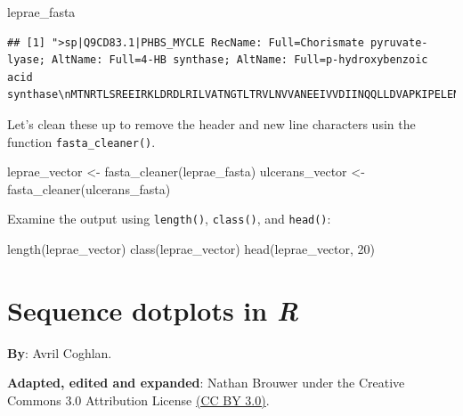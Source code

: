\documentclass[
]{book}
\newenvironment{Shaded}{\begin{snugshade}}{\end{snugshade}}
\newcommand{\DecValTok}[1]{\textcolor[rgb]{0.00,0.00,0.81}{#1}}
\newcommand{\FunctionTok}[1]{\textcolor[rgb]{0.00,0.00,0.00}{#1}}
\newcommand{\NormalTok}[1]{#1}
\newcommand{\OtherTok}[1]{\textcolor[rgb]{0.56,0.35,0.01}{#1}}
\begin{document}
\begin{Shaded}
\begin{Highlighting}[]
\NormalTok{leprae\_fasta}
\end{Highlighting}
\end{Shaded}

\begin{verbatim}
## [1] ">sp|Q9CD83.1|PHBS_MYCLE RecName: Full=Chorismate pyruvate-lyase; AltName: Full=4-HB synthase; AltName: Full=p-hydroxybenzoic acid synthase\nMTNRTLSREEIRKLDRDLRILVATNGTLTRVLNVVANEEIVVDIINQQLLDVAPKIPELENLKIGRILQR\nDILLKGQKSGILFVAAESLIVIDLLPTAITTYLTKTHHPIGEIMAASRIETYKEDAQVWIGDLPCWLADY\nGYWDLPKRAVGRRYRIIAGGQPVIITTEYFLRSVFQDTPREELDRCQYSNDIDTRSGDRFVLHGRVFKNL\n\n"
\end{verbatim}

Let's clean these up to remove the header and new line characters usin the function \texttt{fasta\_cleaner()}.

\begin{Shaded}
\begin{Highlighting}[]
\NormalTok{leprae\_vector   }\OtherTok{\textless{}{-}} \FunctionTok{fasta\_cleaner}\NormalTok{(leprae\_fasta)}
\NormalTok{ulcerans\_vector }\OtherTok{\textless{}{-}} \FunctionTok{fasta\_cleaner}\NormalTok{(ulcerans\_fasta)}
\end{Highlighting}
\end{Shaded}

Examine the output using \texttt{length()}, \texttt{class()}, and \texttt{head()}:

\begin{Shaded}
\begin{Highlighting}[]
\FunctionTok{length}\NormalTok{(leprae\_vector)}
\FunctionTok{class}\NormalTok{(leprae\_vector)}
\FunctionTok{head}\NormalTok{(leprae\_vector, }\DecValTok{20}\NormalTok{)}
\end{Highlighting}
\end{Shaded}

\hypertarget{sequence-dotplots-in-r}{%
\chapter{\texorpdfstring{Sequence dotplots in \emph{R}}{Sequence dotplots in R}}\label{sequence-dotplots-in-r}}

\textbf{By}: Avril Coghlan.

\textbf{Adapted, edited and expanded}: Nathan Brouwer under the Creative Commons 3.0 Attribution License \href{https://creativecommons.org/licenses/by/3.0/}{(CC BY 3.0)}.
\end{document}
